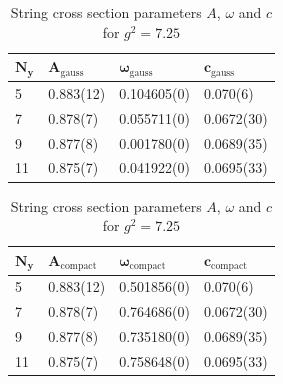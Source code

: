 \begin{table}[!hb]
\centering
\begin{tabular}{llll}
    $\mathbf{N_y}$ & $\mathbf{A_\mathrm{gauss}}$ & $\mathbf{\omega_\mathrm{gauss}}$ & $\mathbf{c_\mathrm{gauss}}$ \\ \hline
   5 & 0.883(12) & 0.104605(0) & 0.070(6) \\
   7 & 0.878(7) & 0.055711(0) & 0.0672(30) \\
   9 & 0.877(8) & 0.001780(0) & 0.0689(35) \\
   11 & 0.875(7) & 0.041922(0) & 0.0695(33) \\
\end{tabular}
\begin{tabular}{llll}
    $\mathbf{N_y}$ & $\mathbf{A_\mathrm{compact}}$ & $\mathbf{\omega_\mathrm{compact}}$ & $\mathbf{c_\mathrm{compact}}$ \\ \hline
   5 & 0.883(12) & 0.501856(0) & 0.070(6) \\
   7 & 0.878(7) & 0.764686(0) & 0.0672(30) \\
   9 & 0.877(8) & 0.735180(0) & 0.0689(35) \\
   11 & 0.875(7) & 0.758648(0) & 0.0695(33) \\
\end{tabular}
\caption{String cross section parameters $A$, $\omega$ and $c$ for $g^2=7.25$}
\end{table}
